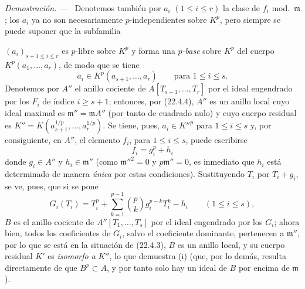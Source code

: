 \documentclass[10pt,oneside]{book}
\newcommand{\oldpage}[2][]{%
  \setcounter{footnote}{0}%
  \marginpar{\scriptsize\textbf{#1}~|~#2}\ignorespaces}
\newenvironment{proof}{%
  \par\medskip\noindent\textit{Demostración. ---\ }}{\par}
\providecommand{\setmin}{-}%
\begin{document}
\begin{proof}
Denotemos también por $a_i$ $(1\leqslant i\leqslant r)$ la clase de $f_i$
mod.~$\mathfrak m$; los $a_i$ ya no son necesariamente $p$-independientes
sobre $K^p$, pero siempre se puede suponer que la subfamilia

\oldpage[0\textsubscript{IV-1}]{199}

$(a_i)_{s+1\leqslant i\leqslant r}$ es $p$-libre sobre $K^p$ y forma una
\emph{$p$-base} sobre $K^p$ del cuerpo $K^p(a_1,\ldots,a_r)$, de modo que se tiene
\[
  a_i\in K^p(a_{s+1},\ldots,a_r)\qquad\text{para }1\leqslant i\leqslant s.
\]
Denotemos por $A''$ el anillo cociente de $A[T_{s+1},\ldots,T_r]$ por el ideal
engendrado por los $F_i$ de índice $i\geqslant s+1$; entonces, por (22.4.4), $A''$
es un anillo local cuyo ideal maximal es $\mathfrak m''=\mathfrak mA''$
(por tanto de cuadrado nulo) y cuyo cuerpo residual es
$K''=K(a_{s+1}^{1/p},\ldots,a_r^{1/p})$. Se tiene, pues,
$a_i\in K''^p$ para $1\leqslant i\leqslant s$ y, por consiguiente, en $A''$,
el elemento $f_i$, para $1\leqslant i\leqslant s$, puede escribirse
\begin{equation}
\label{0.22.4.7.3-es}
  f_i=g_i^p+h_i
  \tag{22.4.7.3}
\end{equation}
donde $g_i\in A''$ y $h_i\in\mathfrak m''$ (como $\mathfrak m''^2=0$ y
$p\mathfrak m''=0$, es inmediato que $h_i$ está determinado de manera
\emph{única} por estas condiciones). Sustituyendo $T_i$ por $T_i+g_i$, se ve, pues,
que si se pone
\[
  G_i(T_i)=T_i^p+\sum_{k=1}^{p-1}\binom pk g_i^{p-k}T_i^k\setmin h_i
  \qquad(1\leqslant i\leqslant s),
\]
$B$ es el anillo cociente de $A''[T_1,\ldots,T_s]$ por el ideal engendrado por los
$G_i$; ahora bien, todos los coeficientes de $G_i$, salvo el coeficiente dominante,
pertenecen a $\mathfrak m''$, por lo que se está en la situación de (22.4.3),
$B$ es un anillo local, y su cuerpo residual $K'$ es \emph{isomorfo a}
$K''$, lo que demuestra (i) (que, por lo demás, resulta directamente de que
$B^p\subset A$, y por tanto solo hay un ideal de $B$ por encima de
$\mathfrak m$).


\end{proof}
\end{document}
